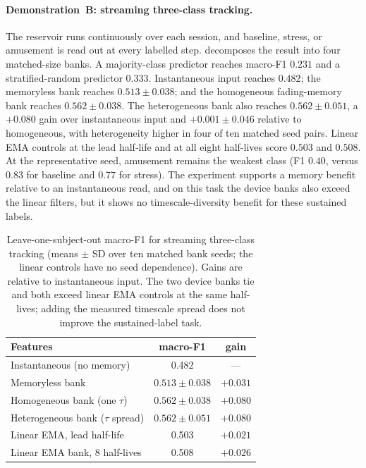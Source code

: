 \documentclass[12pt, twoside]{report}
\begin{document}
\paragraph{Demonstration~B: streaming three-class tracking.} The reservoir runs continuously over each session, and baseline, stress, or amusement is read out at every labelled step.  decomposes the result into four matched-size banks. A majority-class predictor reaches macro-F1 $0.231$ and a stratified-random predictor $0.333$. Instantaneous input reaches $0.482$; the memoryless bank reaches $0.513\pm0.038$; and the homogeneous fading-memory bank reaches $0.562\pm0.038$. The heterogeneous bank also reaches $0.562\pm0.051$, a $+0.080$ gain over instantaneous input and $+0.001\pm0.046$ relative to homogeneous, with heterogeneity higher in four of ten matched seed pairs. Linear EMA controls at the lead half-life and at all eight half-lives score $0.503$ and $0.508$. At the representative seed, amusement remains the weakest class (F1 $0.40$, versus $0.83$ for baseline and $0.77$ for stress). The experiment supports a memory benefit relative to an instantaneous read, and on this task the device banks also exceed the linear filters, but it shows no timescale-diversity benefit for these sustained labels.

\begin{table}[t]
  \centering
  \small
  \caption[Streaming three-class affect tracking on WESAD]{Leave-one-subject-out macro-F1 for streaming three-class \WESAD{} tracking (means $\pm$ SD over ten matched bank seeds; the linear controls have no seed dependence). Gains are relative to instantaneous input. The two device banks tie and both exceed linear EMA controls at the same half-lives; adding the measured timescale spread does not improve the sustained-label task.}
  \label{tab:ch5_wesad}
  \begin{tabular}{lcc}
    \toprule
    Features & macro-F1 & gain \\
    \midrule
    Instantaneous (no memory)          & 0.482             & --- \\
    Memoryless bank                    & $0.513 \pm 0.038$ & $+0.031$ \\
    Homogeneous bank (one $\tau$)      & $\mathbf{0.562 \pm 0.038}$ & $+0.080$ \\
    Heterogeneous bank ($\tau$ spread) & $\mathbf{0.562 \pm 0.051}$ & $+0.080$ \\
    \midrule
    Linear EMA, lead half-life         & 0.503             & $+0.021$ \\
    Linear EMA bank, 8 half-lives      & 0.508             & $+0.026$ \\
    \bottomrule
  \end{tabular}
\end{table}
\end{document}
